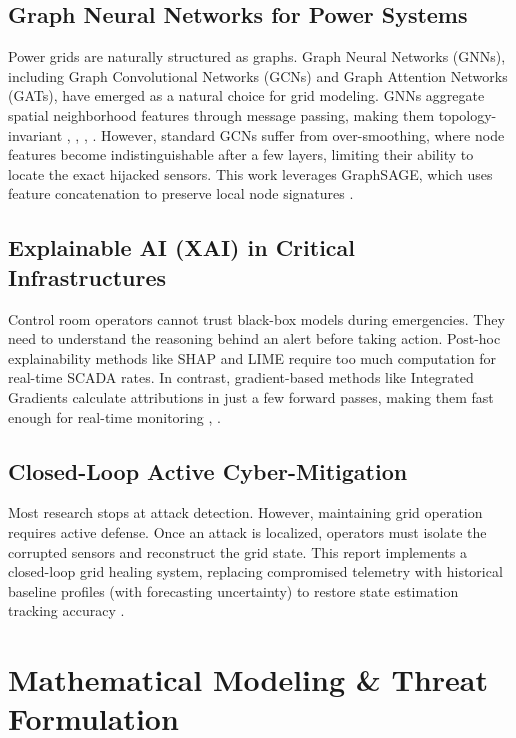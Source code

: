 \documentclass[journal]{IEEEtran}
\begin{document}
\subsection{Graph Neural Networks for Power Systems}
Power grids are naturally structured as graphs. Graph Neural Networks (GNNs), including Graph Convolutional Networks (GCNs) and Graph Attention Networks (GATs), have emerged as a natural choice for grid modeling. GNNs aggregate spatial neighborhood features through message passing, making them topology-invariant \cite{b2}, \cite{b6}, \cite{b12}, \cite{b14}. However, standard GCNs suffer from over-smoothing, where node features become indistinguishable after a few layers, limiting their ability to locate the exact hijacked sensors. This work leverages GraphSAGE, which uses feature concatenation to preserve local node signatures \cite{b8}.

\subsection{Explainable AI (XAI) in Critical Infrastructures}
Control room operators cannot trust black-box models during emergencies. They need to understand the reasoning behind an alert before taking action. Post-hoc explainability methods like SHAP and LIME require too much computation for real-time SCADA rates. In contrast, gradient-based methods like Integrated Gradients calculate attributions in just a few forward passes, making them fast enough for real-time monitoring \cite{b7}, \cite{b10}.

\subsection{Closed-Loop Active Cyber-Mitigation}
Most research stops at attack detection. However, maintaining grid operation requires active defense. Once an attack is localized, operators must isolate the corrupted sensors and reconstruct the grid state. This report implements a closed-loop grid healing system, replacing compromised telemetry with historical baseline profiles (with forecasting uncertainty) to restore state estimation tracking accuracy \cite{b13}.

\section{Mathematical Modeling \& Threat Formulation}
\end{document}

